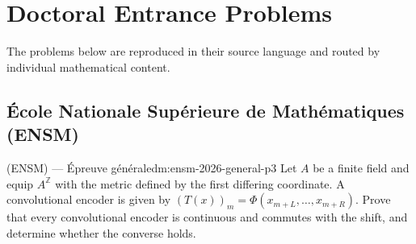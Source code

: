 \chapter{Doctoral Entrance Problems}
\label{ch:problems}

The problems below are reproduced in their source language and routed by individual mathematical content.
\newpage
\section{École Nationale Supérieure de Mathématiques (ENSM)}
\begin{problem}{(ENSM) — Épreuve générale}{dm:ensm-2026-general-p3}
Let $A$ be a finite field and equip $A^{\mathbb Z}$ with the metric defined by the first differing coordinate. A convolutional encoder is given by $(T(x))_m=\Phi(x_{m+L},\ldots,x_{m+R})$. Prove that every convolutional encoder is continuous and commutes with the shift, and determine whether the converse holds.
\end{problem}
